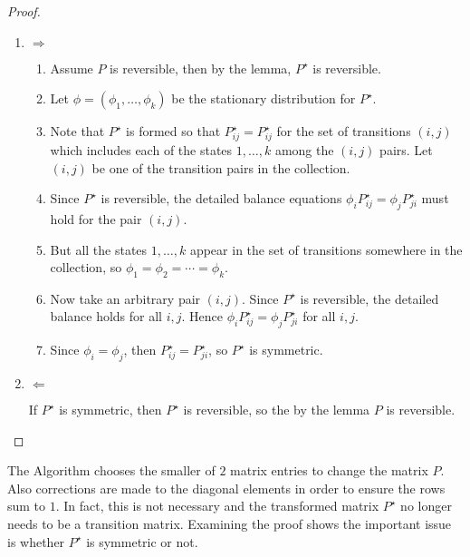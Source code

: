 \documentclass[12pt]{article}
\begin{document}
\begin{proof}
  \begin{enumerate}
  \item $\Rightarrow$
    \begin{enumerate}
    \item Assume $P$ is reversible, then by the lemma, $P^{\star}$ is
      reversible.
    \item Let $\phi = (\phi_1, \dots, \phi_k)$ be the stationary
      distribution for $P^{\star}$.
    \item Note that $P^{\star}$ is formed so that $P_{ij}^{\star} =
      P_{ij}^{\star}$ for the set of transitions $(i,j)$ which
      includes each of the states $1, \dots, k$ among the $(i,j)$
      pairs.  Let $(i,j)$ be one of the transition pairs in the
      collection.
    \item Since $P^{\star}$ is reversible, the detailed balance
      equations  $\phi_i P_{ij}^{\star} = \phi_j
      P_{ji}^{\star}$ must hold for the pair $(i,j)$.
    \item But all the states $1, \dots, k$ appear in the set of
      transitions somewhere in the collection, so $\phi_1 = \phi_2 =
      \cdots = \phi_k$.
    \item Now take an arbitrary pair $(i,j)$.  Since $P^{\star}$ is
      reversible, the detailed balance holds for all $i,j$.  Hence
      $\phi_i P_{ij}^{\star} = \phi_j P_{ji}^{\star}$ for all $i,j$.
    \item Since $\phi_i = \phi_j$, then $P_{ij}^{\star} =
      P_{ji}^{\star}$, so $P^{\star}$ is symmetric.
    \end{enumerate}
  \item $\Leftarrow$

    If $P^{\star}$ is symmetric, then $P^{\star}$ is reversible, so
    the by the lemma $P$ is reversible.
  \end{enumerate}
\end{proof}

\begin{remark}
  The Algorithm chooses the smaller of $2$ matrix entries to
  change the matrix $P$.  Also corrections are made to the diagonal
  elements in order to ensure the rows sum to $1$.  In fact, this is
  not necessary and the transformed matrix $P^{\star}$ no longer needs
  to be a transition matrix.  Examining the proof shows the
  important issue is whether $P^{\star}$ is symmetric or not.
\end{remark}
\end{document}
